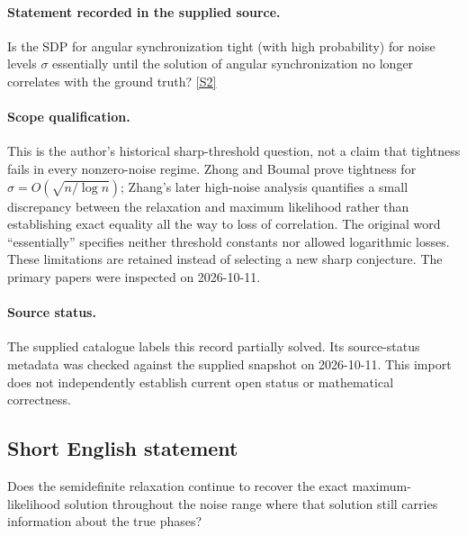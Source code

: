 \documentclass[11pt]{article}
\begin{document}
\paragraph{Statement recorded in the supplied source.}
Is the SDP for angular synchronization tight (with high probability) for noise levels $\sigma$ essentially until the solution of angular synchronization no longer correlates with the ground truth? \href{https://afonsobandeira.wordpress.com/2015/12/09/42l10psynchronization/}{[S2]}
\paragraph{Scope qualification.}
This is the author's historical sharp-threshold question, not a claim that tightness fails in every nonzero-noise regime. Zhong and Boumal prove tightness for $\sigma=O(\sqrt{n/\log n})$; Zhang's later high-noise analysis quantifies a small discrepancy between the relaxation and maximum likelihood rather than establishing exact equality all the way to loss of correlation. The original word ``essentially'' specifies neither threshold constants nor allowed logarithmic losses. These limitations are retained instead of selecting a new sharp conjecture. The primary papers were inspected on 2026-10-11.
\paragraph{Source status.}
The supplied catalogue labels this record partially solved. Its source-status metadata was checked against the supplied snapshot on 2026-10-11. This import does not independently establish current open status or mathematical correctness.
\subsection{Short English statement}
Does the semidefinite relaxation continue to recover the exact maximum-likelihood solution throughout the noise range where that solution still carries information about the true phases?
\end{document}

